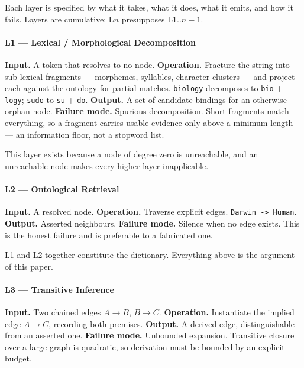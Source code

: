 \documentclass[
  11pt,
  a4paper,
]{article}
\begin{document}
Each layer is specified by what it takes, what it does, what it emits,
and how it fails. Layers are cumulative: L\(n\) presupposes
L\(1..n{-}1\).

\paragraph{L1 --- Lexical / Morphological
Decomposition}\label{l1-lexical-morphological-decomposition}

\textbf{Input.} A token that resolves to no node. \textbf{Operation.}
Fracture the string into sub-lexical fragments --- morphemes, syllables,
character clusters --- and project each against the ontology for partial
matches. \texttt{biology} decomposes to \texttt{bio} + \texttt{logy};
\texttt{sudo} to \texttt{su} + \texttt{do}. \textbf{Output.} A set of
candidate bindings for an otherwise orphan node. \textbf{Failure mode.}
Spurious decomposition. Short fragments match everything, so a fragment
carries usable evidence only above a minimum length --- an information
floor, not a stopword list.

This layer exists because a node of degree zero is unreachable, and an
unreachable node makes every higher layer inapplicable.

\paragraph{L2 --- Ontological Retrieval}\label{l2-ontological-retrieval}

\textbf{Input.} A resolved node. \textbf{Operation.} Traverse explicit
edges. \texttt{Darwin\ -\textgreater{}\ Human}. \textbf{Output.}
Asserted neighbours. \textbf{Failure mode.} Silence when no edge exists.
This is the honest failure and is preferable to a fabricated one.

L1 and L2 together constitute the dictionary. Everything above is the
argument of this paper.

\paragraph{L3 --- Transitive Inference}\label{l3-transitive-inference}

\textbf{Input.} Two chained edges \(A \to B\), \(B \to C\).
\textbf{Operation.} Instantiate the implied edge \(A \to C\), recording
both premises. \textbf{Output.} A derived edge, distinguishable from an
asserted one. \textbf{Failure mode.} Unbounded expansion. Transitive
closure over a large graph is quadratic, so derivation must be bounded
by an explicit budget.
\end{document}
